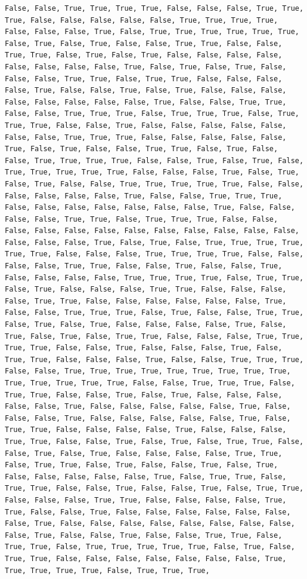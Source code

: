 \documentclass[
  letterpaper,
  DIV=11,
  numbers=noendperiod]{scrartcl}
\begin{document}
\begin{verbatim}
False, False, True, True, True, True, False, False, False, True, True, True, False, False, False, False, False, True, True, True, True, False, False, False, True, False, True, True, True, True, True, True, False, True, False, True, False, False, True, True, False, False, True, True, False, True, False, True, False, False, False, False, False, False, False, False, True, False, True, False, True, False, False, False, True, True, False, True, True, False, False, False, False, True, False, False, True, False, True, False, False, False, False, False, False, False, False, True, False, False, True, True, False, False, True, True, True, False, True, True, True, False, True, True, True, False, False, True, False, False, False, False, False, False, False, True, True, True, False, False, False, False, False, True, False, True, False, False, True, True, False, True, False, False, True, True, True, True, False, False, True, False, True, False, True, True, True, True, True, False, False, False, True, False, True, False, True, False, False, True, True, True, True, True, False, False, False, False, False, False, True, False, False, True, True, True, False, False, False, False, False, False, False, True, False, False, False, False, True, True, False, True, True, True, False, False, False, False, False, False, False, False, False, False, False, False, False, False, False, True, False, True, False, True, True, True, True, True, True, False, False, False, True, True, True, True, False, False, False, False, True, True, False, False, True, False, False, True, False, False, False, False, True, True, True, True, False, True, True, False, True, False, False, False, True, True, False, False, False, False, True, True, False, False, False, False, False, False, True, False, False, True, True, True, False, True, False, False, True, True, False, True, False, True, False, False, False, False, True, False, True, False, True, False, True, True, False, False, False, True, True, True, True, False, False, True, False, False, False, True, False, True, True, False, False, False, True, False, False, True, True, True, False, False, True, True, True, True, True, True, True, True, True, True, True, True, True, True, False, False, True, True, True, False, True, True, False, False, True, False, True, False, False, False, False, False, True, False, False, False, False, False, True, False, False, False, True, False, False, False, False, False, True, False, True, True, False, False, False, False, True, False, False, False, True, True, False, False, True, False, True, False, True, True, False, False, True, False, True, False, False, False, False, True, True, False, True, True, False, True, False, False, True, False, True, False, False, False, False, False, True, False, True, True, False, True, True, False, False, True, False, False, True, False, True, True, False, False, False, True, True, False, False, False, False, True, True, False, False, True, False, False, False, False, False, False, False, True, False, False, False, False, False, False, False, False, False, True, False, False, True, False, False, True, True, False, True, True, False, True, True, True, True, True, False, True, False, True, True, False, False, False, False, False, False, False, True, True, True, True, True, False, True, True, True, 
\end{verbatim}
\end{document}
